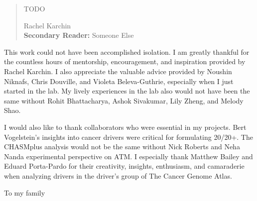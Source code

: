 
\begin{frontmatter}

\maketitle

\begin{abstract}

TODO

\vfill
{} Rachel Karchin \\
{\bf{Secondary Reader:}} Someone Else
\end{abstract}

\begin{acknowledgment}

This work could not have been accomplished isolation. I am greatly thankful for the countless hours of mentorship, encouragement, and inspiration provided by Rachel Karchin. I also appreciate the valuable advice provided by Noushin Niknafs, Chris Douville, and Violeta Beleva-Guthrie, especially when I just started in the lab. My lively experiences in the lab also would not have been the same without Rohit Bhattacharya, Ashok Sivakumar, Lily Zheng, and Melody Shao.

I would also like to thank collaborators who were essential in my projects. Bert Vogelstein's insights into cancer drivers were critical for formulating 20/20+. The CHASMplus analysis would not be the same without Nick Roberts and Neha Nanda experimental perspective on ATM. I especially thank Matthew Bailey and Eduard Porta-Pardo for their creativity, insights, enthusiasm, and camaraderie when analyzing drivers in the driver's group of The Cancer Genome Atlas.

\end{acknowledgment}

\begin{dedication}
 
To my family

\end{dedication}

\tableofcontents

\listoftables

\listoffigures

\end{frontmatter}

